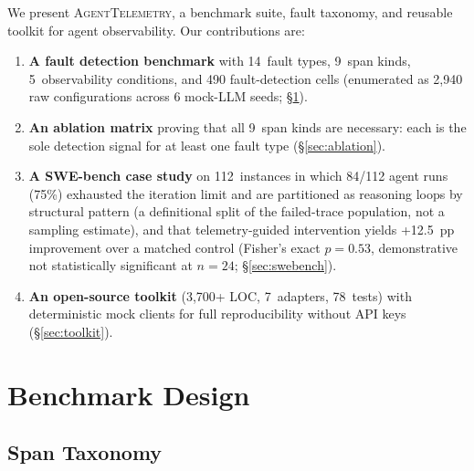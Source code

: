 \documentclass[sigconf,screen]{acmart}
\begin{document}
We present \textsc{AgentTelemetry}, a benchmark suite, fault taxonomy,
and reusable toolkit for agent observability.  Our contributions are:

\begin{enumerate}[leftmargin=*,nosep]
\item \textbf{A fault detection benchmark} with 14~fault types,
  9~span kinds, 5~observability conditions, and 490 fault-detection
  cells (enumerated as 2{,}940 raw configurations across 6
  mock-LLM seeds; \S\ref{sec:benchmark}).

\item \textbf{An ablation matrix} proving that all 9~span kinds are
  necessary: each is the sole detection signal for at least one fault
  type (\S\ref{sec:ablation}).

\item \textbf{A SWE-bench case study} on 112~instances in which 84/112
  agent runs (75\%) exhausted the iteration limit and are partitioned
  as reasoning loops by structural pattern (a definitional split of the
  failed-trace population, not a sampling estimate), and that
  telemetry-guided intervention yields +12.5~pp improvement over a
  matched control (Fisher's exact $p=0.53$, demonstrative not
  statistically significant at $n{=}24$; \S\ref{sec:swebench}).

\item \textbf{An open-source toolkit} (3{,}700+ LOC, 7~adapters,
  78~tests) with deterministic mock clients for full reproducibility
  without API keys (\S\ref{sec:toolkit}).
\end{enumerate}

\section{Benchmark Design}
\label{sec:benchmark}

\subsection{Span Taxonomy}
\end{document}
